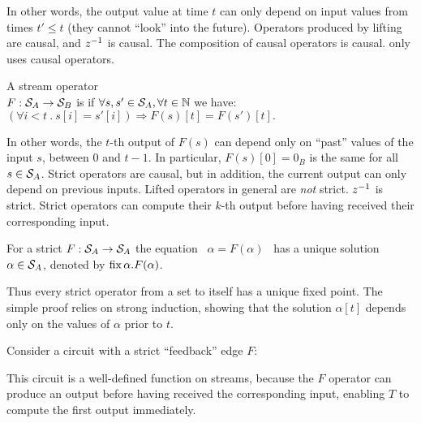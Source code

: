 \noindent
In other words, the output value at time $t$ can only depend on input
values from times $t' \leq t$ (they cannot ``look'' into the future).
Operators produced by lifting are causal, and $z^{-1}$ is causal.  The
composition of causal operators is causal.  \dbsp only uses causal
operators.

\begin{definition}[Strictness]
A stream operator \\ $F:\mathcal{S}_{A}\to\mathcal{S}_{B}$
is 
if  $\forall s,s'\in\mathcal{S}_{A}, \forall t \in \mathbb{N}$ we have:
$(\forall i<t~.~s[i]=s'[i]) \Rightarrow F(s)[t]=F(s')[t].$
\end{definition}

In other words, the $t$-th output of $F(s)$ can depend only on
``past'' values of the input $s$, between $0$ and $t-1$.  In
particular, $F(s)[0] = 0_B$ is the same for all $s \in \mathcal{S}_{A}$.
Strict operators are causal, but in addition, the current output can
only depend on previous inputs.  Lifted operators in general are
\emph{not} strict.  $z^{-1}$ is strict.  Strict operators can compute
their $k$-th output before having received their corresponding input.

\begin{proposition}
\label{prop-unique-fix}
For a strict $F: \mathcal{S}_{A} \to \mathcal{S}_{A}$ the equation ~$\alpha=F(\alpha)$~ has a unique
solution $\alpha \in \mathcal{S}_{A}$, denoted by $\mbox{fix}\,\alpha.F(\alpha)$.
\end{proposition}

Thus every strict operator from a set to itself has a unique fixed
point.  The simple proof relies on strong induction, showing that the
solution $\alpha[t]$ depends only on the values of $\alpha$ prior to
$t$.

Consider a circuit with a strict ``feedback'' edge $F$:
\begin{center}
\end{center}

This circuit is a well-defined function on streams, because the $F$
operator can produce an output before having received the
corresponding input, enabling $T$ to compute the first output
immediately.

